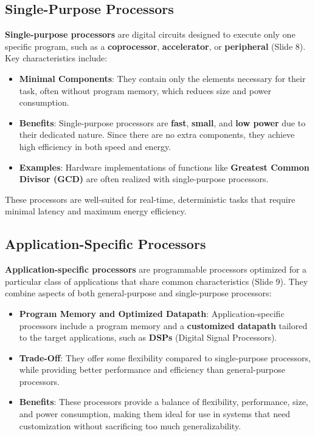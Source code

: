\documentclass[
  14pt,
  a4paper,
  numbers=noendperiod,
  headinclude=true,
  footinclude=true,
  DIV=calc]{scrreprt}
\begin{document}
\subsection{Single-Purpose Processors}\label{single-purpose-processors}

\textbf{Single-purpose processors} are digital circuits designed to
execute only one specific program, such as a \textbf{coprocessor},
\textbf{accelerator}, or \textbf{peripheral} (Slide 8). Key
characteristics include:

\begin{itemize}
\item
  \textbf{Minimal Components}: They contain only the elements necessary
  for their task, often without program memory, which reduces size and
  power consumption.
\item
  \textbf{Benefits}: Single-purpose processors are \textbf{fast},
  \textbf{small}, and \textbf{low power} due to their dedicated nature.
  Since there are no extra components, they achieve high efficiency in
  both speed and energy.
\item
  \textbf{Examples}: Hardware implementations of functions like
  \textbf{Greatest Common Divisor (GCD)} are often realized with
  single-purpose processors.
\end{itemize}

These processors are well-suited for real-time, deterministic tasks that
require minimal latency and maximum energy efficiency.

\subsection{Application-Specific
Processors}\label{application-specific-processors}

\textbf{Application-specific processors} are programmable processors
optimized for a particular class of applications that share common
characteristics (Slide 9). They combine aspects of both general-purpose
and single-purpose processors:

\begin{itemize}
\item
  \textbf{Program Memory and Optimized Datapath}: Application-specific
  processors include a program memory and a \textbf{customized datapath}
  tailored to the target applications, such as \textbf{DSPs} (Digital
  Signal Processors).
\item
  \textbf{Trade-Off}: They offer some flexibility compared to
  single-purpose processors, while providing better performance and
  efficiency than general-purpose processors.
\item
  \textbf{Benefits}: These processors provide a balance of flexibility,
  performance, size, and power consumption, making them ideal for use in
  systems that need customization without sacrificing too much
  generalizability.
\end{itemize}
\end{document}
